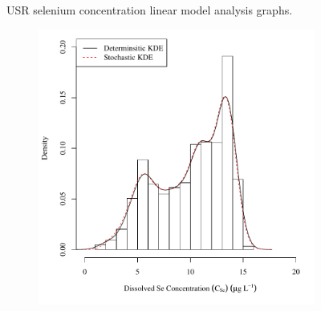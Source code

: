 \begin{linenumbers}
\begin{landscape}
\begin{figure}
\begin{subfigure}{0.7\textwidth}
		\end{subfigure}\\
		\caption{USR selenium concentration linear model analysis graphs.}
	\end{figure}
\end{landscape}

\subfiguremid
\begin{landscape}
	\begin{figure}
		\begin{subfigure}{0.7\textwidth}
			\centering
			\includegraphics[width=\tableCustomSize]{"Figures/Results_USR/Stochastic/c d&s est HOL"}
		\end{subfigure}%
		\begin{subfigure}{0.7\textwidth}
			\centering

\end{subfigure}
\end{figure}
\end{landscape}
\end{linenumbers}

